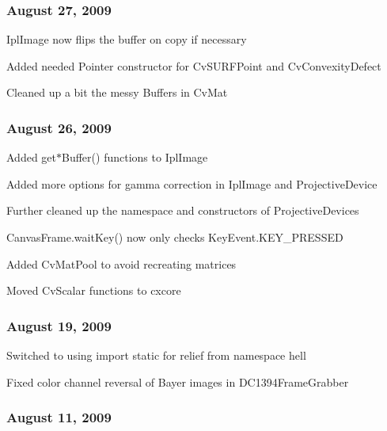 \subsubsection*{August 27, 2009}


\begin{DoxyItemize}
\item {\ttfamily Ipl\+Image} now flips the buffer on copy if necessary
\item Added needed Pointer constructor for {\ttfamily Cv\+S\+U\+R\+F\+Point} and {\ttfamily Cv\+Convexity\+Defect}
\item Cleaned up a bit the messy Buffers in {\ttfamily Cv\+Mat}
\end{DoxyItemize}

\subsubsection*{August 26, 2009}


\begin{DoxyItemize}
\item Added {\ttfamily get$\ast$\+Buffer()} functions to {\ttfamily Ipl\+Image}
\item Added more options for gamma correction in {\ttfamily Ipl\+Image} and {\ttfamily Projective\+Device}
\item Further cleaned up the namespace and constructors of {\ttfamily Projective\+Devices}
\item {\ttfamily Canvas\+Frame.\+wait\+Key()} now only checks {\ttfamily Key\+Event.\+K\+E\+Y\+\_\+\+P\+R\+E\+S\+S\+E\+D}
\item Added {\ttfamily Cv\+Mat\+Pool} to avoid recreating matrices
\item Moved {\ttfamily Cv\+Scalar} functions to {\ttfamily cxcore}
\end{DoxyItemize}

\subsubsection*{August 19, 2009}


\begin{DoxyItemize}
\item Switched to using {\ttfamily import static} for relief from namespace hell
\item Fixed color channel reversal of Bayer images in {\ttfamily D\+C1394\+Frame\+Grabber}
\end{DoxyItemize}

\subsubsection*{August 11, 2009}

